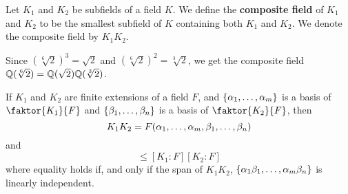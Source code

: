 \begin{definition}
  Let $K_1$ and $K_2$ be subfields of a field $K$. We define the
  \textbf{composite field} of $K_1$ and $K_2$ to be the smallest
  subfield of $K$ containing both $K_1$ and $K_2$. We denote the
  composite field by $K_1K_2$.
\end{definition}

\begin{example}\label{example_8.10}
  Since $(\sqrt[6]{2})^3=\sqrt{2}$ and $(\sqrt[6]{2})^2=\sqrt[3]{2}$,
  we get the composite field
  $\mathbb{Q}(\sqrt[6]{2})=\mathbb{Q}(\sqrt{2})\mathbb{Q}(\sqrt[3]{2})$.
\end{example}

\begin{proposition}\label{proposition_8.2.9}
  If $K_1$ and $K_2$ are finite extensions of a field $F$, and  $\{
  \alpha_1, \dots, \alpha_m \}$ is a basis of $\faktor{K_1}{F}$ and $\{ \beta_1,
  \dots, \beta_n \}$ is a basis of $\faktor{K_2}{F}$, then
  \begin{equation*}
    K_1K_2=F(\alpha_1, \dots, \alpha_m,\beta_1, \dots, \beta_n)
  \end{equation*}
  and
  \begin{equation*}
    [K_1K_2:F] \leq [K_1:F][K_2:F]
  \end{equation*}
  where equality holds if, and only if the span of $K_1K_2$,
  $\{\alpha_1\beta_1, \dots, \alpha_m\beta_n\}$ is linearly independent.
\end{proposition}
